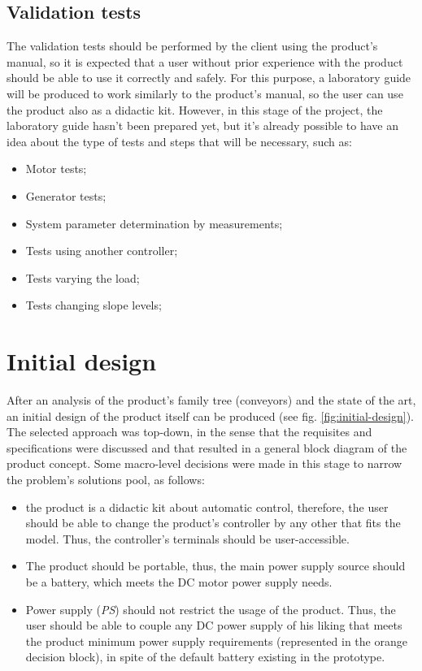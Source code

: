 \documentclass[11pt]{article}
\begin{document}
\subsection{Validation tests}
\label{sec:org36c46e4}
The validation tests should be performed by the client using the product’s
manual, so it is expected that a user without prior experience with the product
should be able to use it correctly and safely. 
For this purpose, a laboratory guide will be produced to work similarly to the
product’s manual, so the user can use the product also as a didactic kit. However, in this stage of the project, the laboratory guide hasn’t been prepared yet, but it’s already possible to have an idea about the type of tests and steps that will be necessary, such as:
\begin{itemize}
\item Motor tests;
\item Generator tests;
\item System parameter determination by measurements;
\item Tests using another controller;
\item Tests varying the load;
\item Tests changing slope levels;
\end{itemize}

\section{Initial design}
\label{sec:orgbc75a64}
After an analysis of the product's family tree (conveyors) and the
state of the art, an initial design of the product itself can be produced (see
fig. \ref{fig:initial-design}). 
The selected approach was top-down, in the sense that the
requisites and specifications were discussed and that resulted in a general
block diagram of the product concept. Some macro-level decisions were made
in this stage to narrow the problem's solutions pool, as follows:
\begin{itemize}
\item the product is a didactic kit about automatic control, therefore, the user
should be able to change the product's controller by any other that fits the
model. Thus, the controller's terminals should be user-accessible.
\item The product should be portable, thus, the main power supply source should be a
battery, which meets the DC motor power supply needs.
\item Power supply (\emph{PS}) should not restrict the usage of the product. Thus, the
user should be able to couple any DC power supply of his liking that meets the
product minimum power supply requirements (represented in the orange decision
block), in spite of the default battery existing in the prototype.
\end{itemize}
\end{document}
